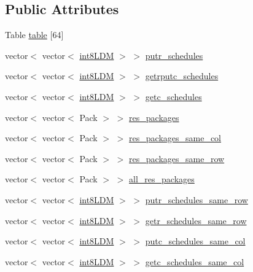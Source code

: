 \subsection*{Public Attributes}
\begin{DoxyCompactItemize}
\item 
Table \hyperlink{classRlmpiInitializer_a11c91777026788de0ec214104d18f4dd}{table} \mbox{[}64\mbox{]}
\item 
vector$<$ vector$<$ \hyperlink{RlmpiSharedType_8h_a69782ffde89d45e86308f10afedf08a6}{int8LDM} $>$ $>$ \hyperlink{classRlmpiInitializer_a649f1946c99b9d74f9aef3101e6e5c22}{putr\_\-schedules}
\item 
vector$<$ vector$<$ \hyperlink{RlmpiSharedType_8h_a69782ffde89d45e86308f10afedf08a6}{int8LDM} $>$ $>$ \hyperlink{classRlmpiInitializer_ab3cd44876cccbd2cc88abfcb665a3158}{getrputc\_\-schedules}
\item 
vector$<$ vector$<$ \hyperlink{RlmpiSharedType_8h_a69782ffde89d45e86308f10afedf08a6}{int8LDM} $>$ $>$ \hyperlink{classRlmpiInitializer_a884544b454acc8ab2d7708b3d014df18}{getc\_\-schedules}
\item 
vector$<$ vector$<$ Pack $>$ $>$ \hyperlink{classRlmpiInitializer_a95d99d1e97798553fd7232f747a4c838}{res\_\-packages}
\item 
vector$<$ vector$<$ Pack $>$ $>$ \hyperlink{classRlmpiInitializer_a2b59d072cb46e37f839878474f72caab}{res\_\-packages\_\-same\_\-col}
\item 
vector$<$ vector$<$ Pack $>$ $>$ \hyperlink{classRlmpiInitializer_a1f7bed6d1cfc17f69638cd94a066308a}{res\_\-packages\_\-same\_\-row}
\item 
vector$<$ vector$<$ Pack $>$ $>$ \hyperlink{classRlmpiInitializer_ade747e8e8f35ccc1ce696396a1714a6e}{all\_\-res\_\-packages}
\item 
vector$<$ vector$<$ \hyperlink{RlmpiSharedType_8h_a69782ffde89d45e86308f10afedf08a6}{int8LDM} $>$ $>$ \hyperlink{classRlmpiInitializer_a1a386df1505a50d37dbe36c9c9a50810}{putr\_\-schedules\_\-same\_\-row}
\item 
vector$<$ vector$<$ \hyperlink{RlmpiSharedType_8h_a69782ffde89d45e86308f10afedf08a6}{int8LDM} $>$ $>$ \hyperlink{classRlmpiInitializer_adf5cced6566acc06f9395e91cf4e4f14}{getr\_\-schedules\_\-same\_\-row}
\item 
vector$<$ vector$<$ \hyperlink{RlmpiSharedType_8h_a69782ffde89d45e86308f10afedf08a6}{int8LDM} $>$ $>$ \hyperlink{classRlmpiInitializer_a75b184687ae1ede0487c1091831159d8}{putc\_\-schedules\_\-same\_\-col}
\item 
vector$<$ vector$<$ \hyperlink{RlmpiSharedType_8h_a69782ffde89d45e86308f10afedf08a6}{int8LDM} $>$ $>$ \hyperlink{classRlmpiInitializer_a63308daede91a0421f67807599a493ce}{getc\_\-schedules\_\-same\_\-col}
\end{DoxyCompactItemize}
